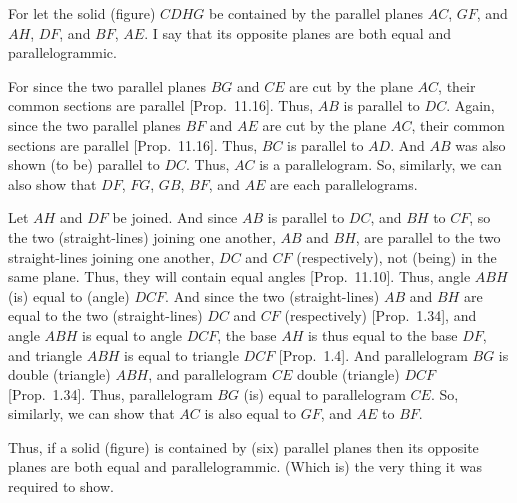\begin{Parallel}{}{}
{\epsfysize=1.5in
\centerline{}

For let the solid (figure) $CDHG$ be contained by the parallel planes
$AC$, $GF$, and $AH$, $DF$, and $BF$, $AE$. I say that its opposite
planes are both equal and parallelogrammic.

For since the two parallel planes $BG$ and $CE$ are cut by the plane
$AC$, their common sections are parallel [Prop.~11.16]. Thus, $AB$ is parallel to $DC$.  Again, since
the two parallel planes $BF$ and $AE$ are cut by the plane
$AC$, their common sections are parallel [Prop.~11.16]. Thus,  $BC$ is parallel to $AD$. And
$AB$ was also shown (to be) parallel to $DC$. Thus, $AC$ is a parallelogram. So, similarly, we can also show that $DF$, $FG$, $GB$,
$BF$, and $AE$ are each parallelograms.

Let $AH$ and $DF$ be joined. And since $AB$ is parallel to
$DC$, and $BH$ to $CF$, so the two (straight-lines) joining one another,
$AB$ and $BH$,
are parallel to the two straight-lines joining one another, $DC$ and
$CF$ (respectively), not (being) in the same plane. Thus, they
will contain equal angles [Prop.~11.10]. Thus,
angle $ABH$ (is) equal to (angle) $DCF$. And since the two (straight-lines)
$AB$ and $BH$ are equal to the two (straight-lines) $DC$ and $CF$ (respectively) [Prop.~1.34], and angle $ABH$ is equal to angle $DCF$, the base
$AH$ is thus equal to the base $DF$, and triangle $ABH$ is equal to
triangle $DCF$ [Prop.~1.4]. And parallelogram
$BG$ is double (triangle) $ABH$, and parallelogram $CE$
double (triangle) $DCF$ [Prop.~1.34]. Thus,
parallelogram $BG$ (is) equal to parallelogram $CE$. So, similarly,
we can show that $AC$ is also equal to $GF$, and $AE$ to $BF$.

Thus, if a solid (figure) is contained by (six) parallel planes then its opposite planes
are both equal and parallelogrammic. (Which is) the very thing it was required to
show.}
\end{Parallel}

